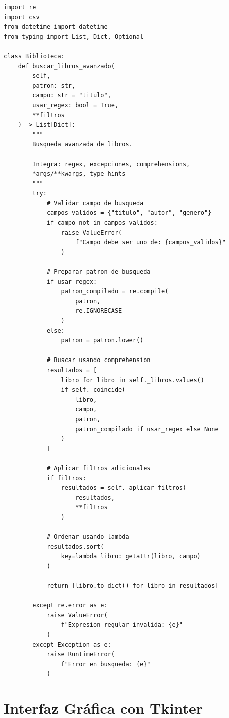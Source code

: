 \documentclass[12pt,a4paper]{article}
\begin{document}
\begin{lstlisting}[caption=Ejemplo de método que integra múltiples conceptos]
import re
import csv
from datetime import datetime
from typing import List, Dict, Optional

class Biblioteca:
    def buscar_libros_avanzado(
        self, 
        patron: str, 
        campo: str = "titulo",
        usar_regex: bool = True,
        **filtros
    ) -> List[Dict]:
        """
        Busqueda avanzada de libros.
        
        Integra: regex, excepciones, comprehensions, 
        *args/**kwargs, type hints
        """
        try:
            # Validar campo de busqueda
            campos_validos = {"titulo", "autor", "genero"}
            if campo not in campos_validos:
                raise ValueError(
                    f"Campo debe ser uno de: {campos_validos}"
                )
            
            # Preparar patron de busqueda
            if usar_regex:
                patron_compilado = re.compile(
                    patron, 
                    re.IGNORECASE
                )
            else:
                patron = patron.lower()
            
            # Buscar usando comprehension
            resultados = [
                libro for libro in self._libros.values()
                if self._coincide(
                    libro, 
                    campo, 
                    patron, 
                    patron_compilado if usar_regex else None
                )
            ]
            
            # Aplicar filtros adicionales
            if filtros:
                resultados = self._aplicar_filtros(
                    resultados, 
                    **filtros
                )
            
            # Ordenar usando lambda
            resultados.sort(
                key=lambda libro: getattr(libro, campo)
            )
            
            return [libro.to_dict() for libro in resultados]
            
        except re.error as e:
            raise ValueError(
                f"Expresion regular invalida: {e}"
            )
        except Exception as e:
            raise RuntimeError(
                f"Error en busqueda: {e}"
            )
\end{lstlisting}

\section{Interfaz Gráfica con Tkinter}
\end{document}
